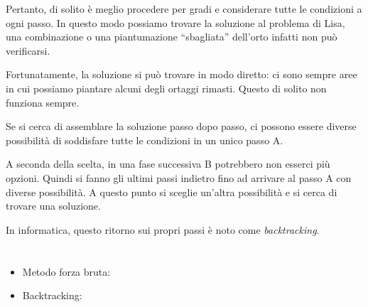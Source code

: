 {{Pertanto, di solito è meglio procedere per gradi e considerare tutte le condizioni a ogni passo. In questo modo possiamo trovare la soluzione al problema di Lisa, una combinazione o una piantumazione \enquote{sbagliata} dell’orto infatti non può verificarsi.

Fortunatamente, la soluzione si può trovare in modo diretto: ci sono sempre aree in cui possiamo piantare alcuni degli ortaggi rimasti. Questo di solito non funziona sempre.

Se si cerca di assemblare la soluzione passo dopo passo, ci possono essere diverse possibilità di soddisfare tutte le condizioni in un unico passo A.

{\centering%
\par}

A seconda della scelta, in una fase successiva B potrebbero non esserci più opzioni. Quindi si fanno gli ultimi passi indietro fino ad arrivare al passo A con diverse possibilità. A questo punto si sceglie un’altra possibilità e si cerca di trovare una soluzione.

In informatica, questo ritorno sui propri passi è noto come \emph{backtracking}.



\section*{\BrochureWebsitesAndKeywords}
{\raggedright
\begin{itemize}
  \item Metodo forza bruta: \href{https://it.wikipedia.org/wiki/Metodo_forza_bruta}{}
  \item Backtracking: \href{https://it.wikipedia.org/wiki/Backtracking}{}
\end{itemize}


}

}{}

}
